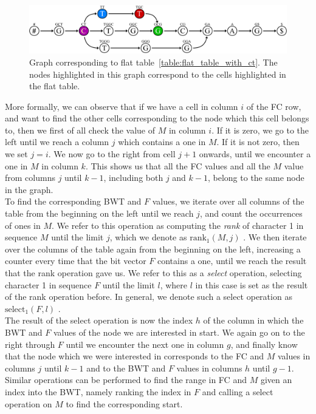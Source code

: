 \documentclass[a4paper,12pt,twoside,BCOR=10mm]{scrbook}
\begin{document}
\begin{figure}[!htb]
\centering
\includegraphics[width=\textwidth]{evo_fig_flat_table_with_ct.pdf}
\caption[Graph corresponding to a flat table]{Graph corresponding to flat table~\ref{table:flat_table_with_ct}. The nodes highlighted in this graph correspond to the cells highlighted in the flat table.} \label{fig:evo_fig_flat_table_with_ct}
\end{figure}
More formally, we can observe that
if we have a cell in column $ i $ of the FC row, and want to find the other cells corresponding to
the node which this cell belongs to, then we first of all check the value of $ M $ in column $ i $.
If it is zero, we go to the left until we reach a column $ j $ which contains a one in $ M $.
If it is not zero, then we set $ j = i $.
We now go to the right from cell $ j + 1 $ onwards, until we encounter a one in $ M $ in column $ k $.
This shows us that all the FC values and all the $ M $ value
from columns $ j $ until $ k - 1 $, including both $ j $ and $ k - 1 $,
belong to the same node in the graph. \\
To find the corresponding BWT and $ F $ values, we iterate over all columns of the table from the beginning on
the left until we reach $ j $, and count the occurrences of ones in $ M $.
We refer to this operation as computing the \textit{rank} of character 1 in sequence $ M $ until the limit $ j $,
which we denote as $ \textrm{rank}_1 ( M, j ) $ \citep{Siren2009}.\label{def:rank}
We then iterate over the columns of the table again from the beginning on the left,
increasing a counter every time that the bit vector $ F $ contains a one, until we reach
the result that the rank operation gave us.
We refer to this as a \textit{select} operation, selecting character 1 in sequence $ F $ until the limit $ l $,
where $ l $ in this case is set as the result of the rank operation before. In general,
we denote such a select operation as $ \textrm{select}_1 ( F, l ) $ \citep{Siren2009}.\label{def:select} \\
The result of the select operation is now the index $ h $ of the column in which the BWT and $ F $ values
of the node we are interested in start.
We again go on to the right through $ F $ until we encounter the next one in column $ g $,
and finally know that the node which we were interested in corresponds to the
FC and $ M $ values in columns $ j $ until $ k - 1 $ and to the BWT and $ F $ values in columns $ h $ until $ g - 1 $. \\
Similar operations can be performed to find the range in FC and $ M $ given an index into the BWT,
namely ranking the index in $ F $ and calling a select operation on $ M $ to find the corresponding start.
\end{document}
